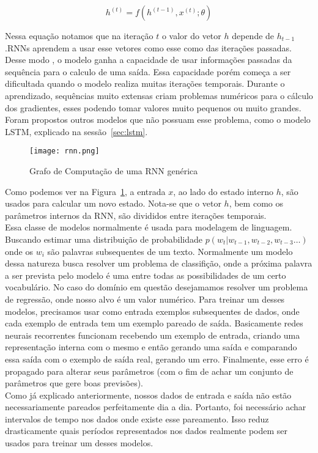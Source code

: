 \[h^{(t)} = f(h^{(t-1)},x^{(t)};\theta)\]

Nessa equação notamos que na iteração $t$ o valor do vetor $h$ depende de
$h_{t-1}$.RNNs aprendem a usar esse vetores como esse como
 das iterações passadas. Desse modo , o modelo ganha a capacidade
de usar informações passadas da sequência para o calculo
de uma saída. Essa capacidade porém começa a ser dificultada quando o modelo
realiza muitas iterações temporais. Durante o aprendizado, sequências muito
extensas criam problemas numéricos para o cálculo dos gradientes, esses podendo
tomar valores muito pequenos ou muito grandes. Foram propostos outros modelos
que não possuam esse problema, como o modelo LSTM, explicado na sessão~\ref{sec:lstm}. 

\begin{figure}[H]
\centering
\texttt{[image: rnn.png]}
\caption{Grafo de Computação de uma RNN genérica \citep{dlbook}}
\label{fig:rnngraph}
\end{figure}

Como podemos ver na Figura~\ref{fig:rnngraph}, a entrada $x$, ao lado do estado
interno $h$, são usados para calcular um novo estado. Nota-se que o vetor $h$,
bem como os parâmetros internos da RNN, são divididos entre iterações temporais.
\\

Essa classe de modelos normalmente é usada para modelagem de linguagem. Buscando
estimar uma distribuição de probabilidade $p(w_t | w_{t-1},w_{t-2},w_{t-3} \dots
) $ onde os $w_i$ são palavras subsequentes de um texto. Normalmente um modelo
dessa natureza busca resolver um problema de classifição, onde a próxima palavra
a ser prevista pelo modelo é uma entre todas as possibilidades de um certo
vocabulário. No caso do domínio em questão desejamamos resolver um problema de
regressão, onde nosso alvo é um valor numérico. Para treinar um desses modelos,
precisamos usar como entrada exemplos subsequentes de dados, onde cada exemplo
de entrada tem um exemplo pareado de saída. Basicamente redes neurais
recorrentes funcionam recebendo um exemplo de entrada, criando uma representação
interna com o mesmo e então gerando uma saída e comparando essa saída com o
exemplo de saída real, gerando um erro. Finalmente, esse erro é propagado para
alterar seus parâmetros (com o fim de achar um conjunto de parâmetros que gere
boas previsões). \\ 


Como já explicado anteriormente, nossos dados de entrada e saída não estão necessariamente pareados perfeitamente dia a dia. Portanto, foi necessário achar intervalos de tempo nos dados onde existe esse pareamento. Isso reduz drasticamente quais períodos representados nos dados realmente podem ser usados para treinar um desses modelos.



